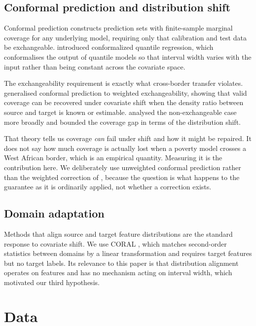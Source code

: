 \documentclass[11pt]{article}
\begin{document}
\subsection{Conformal prediction and distribution shift}

Conformal prediction \citep{vovk2005} constructs prediction sets with
finite-sample marginal coverage for any underlying model, requiring only that
calibration and test data be exchangeable. \citet{romano2019} introduced
conformalized quantile regression, which conformalises the output of quantile
models so that interval width varies with the input rather than being constant
across the covariate space.

The exchangeability requirement is exactly what cross-border transfer violates.
\citet{tibshirani2019} generalised conformal prediction to weighted
exchangeability, showing that valid coverage can be recovered under covariate
shift when the density ratio between source and target is known or estimable.
\citet{barber2023} analysed the non-exchangeable case more broadly and bounded
the coverage gap in terms of the distribution shift.

That theory tells us coverage \emph{can} fail under shift and how it might be
repaired. It does not say how much coverage is actually lost when a poverty
model crosses a West African border, which is an empirical quantity. Measuring
it is the contribution here. We deliberately use unweighted conformal
prediction rather than the weighted correction of \citet{tibshirani2019},
because the question is what happens to the guarantee as it is ordinarily
applied, not whether a correction exists.

\subsection{Domain adaptation}

Methods that align source and target feature distributions are the standard
response to covariate shift. We use CORAL \citep{sun2016}, which matches
second-order statistics between domains by a linear transformation and requires
target features but no target labels. Its relevance to this paper is that
distribution alignment operates on features and has no mechanism acting on
interval width, which motivated our third hypothesis.

\section{Data}
\end{document}
